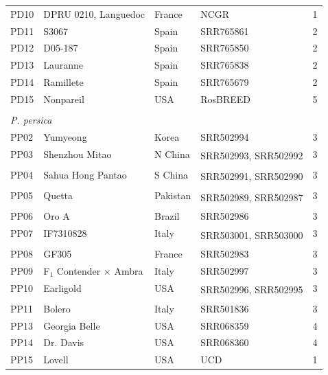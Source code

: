 \documentclass[12pt]{article}
\begin{document}
\begin{center}
\begin{longtable}{lllll}
	PD10 &DPRU 0210, Languedoc &France &NCGR &1\\
	PD11 &S3067 &Spain &SRR765861 &2\\
	PD12 &D05-187 &Spain &SRR765850 &2\\
	PD13 &Lauranne &Spain &SRR765838 &2\\
	PD14 &Ramillete &Spain &SRR765679 &2\\
	PD15 &Nonpareil & USA&RosBREED &5\\
	\\
	\multicolumn{5}{l}{\emph{P. persica}}  \\ %
	PP02 &Yumyeong &Korea &SRR502994 &3\\
	PP03 &Shenzhou Mitao &N China &
	\multirow{2}{1cm}{SRR502993, SRR502992} &3\\
	\\
	PP04 &Sahua Hong Pantao &S China &
	\multirow{2}{1cm}{SRR502991, SRR502990} &3\\
	\\
	PP05 &Quetta &Pakistan &
	\multirow{2}{1cm}{SRR502989, SRR502987} &3\\
	\\
	PP06 &Oro A &Brazil &SRR502986 &3\\
	PP07 &IF7310828 &Italy &
	\multirow{2}{2cm}{SRR503001, SRR503000} &3\\
	\\
	PP08 &GF305 &France &SRR502983 &3\\
	PP09 &F$_{1}$ Contender $\times$ Ambra &Italy &SRR502997 &3\\
	PP10 &Earligold &USA &
	\multirow{2}{1cm}{SRR502996, SRR502995} &3\\
	\\
	PP11 &Bolero &Italy &SRR501836 &3\\
	PP13 &Georgia Belle &USA &SRR068359 &4\\
	PP14 &Dr. Davis &USA &SRR068360 &4\\
	PP15 &Lovell &USA &UCD &1\\

\end{longtable}
\end{center}
\end{document}
